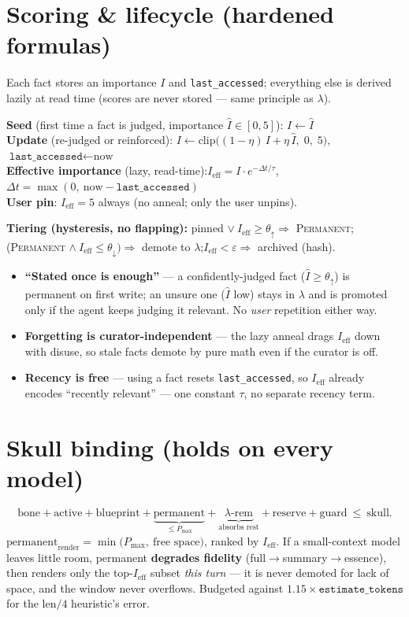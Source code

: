 \documentclass[11pt]{article}
\begin{document}
\section{Scoring \& lifecycle (hardened formulas)}
Each fact stores an importance $I$ and \texttt{last\_accessed}; everything else is derived lazily at read time (scores are never stored — same principle as $\lambda$).
\begin{keybox}
\textbf{Seed} (first time a fact is judged, importance $\hat I\in[0,5]$): \quad $I \gets \hat I$\\[2pt]
\textbf{Update} (re-judged or reinforced): \quad $I \gets \mathrm{clip}\big((1-\eta)\,I + \eta\,\hat I,\;0,\;5\big)$,\quad $\texttt{last\_accessed}\gets\text{now}$\\[2pt]
\textbf{Effective importance} (lazy, read-time):\quad $I_{\text{eff}} = I\cdot e^{-\Delta t/\tau}$,\quad $\Delta t=\max(0,\ \text{now}-\texttt{last\_accessed})$\\[2pt]
\textbf{User pin}: $I_{\text{eff}}=5$ always (no anneal; only the user unpins).
\end{keybox}
\textbf{Tiering (hysteresis, no flapping):} pinned $\lor\ I_{\text{eff}}\ge\theta_\uparrow \Rightarrow$ \textsc{Permanent};\quad (\textsc{Permanent} $\land\ I_{\text{eff}}\le\theta_\downarrow) \Rightarrow$ demote to $\lambda$;\quad $I_{\text{eff}}<\varepsilon \Rightarrow$ archived (hash).
\begin{itemize}[itemsep=0pt]
\item \textbf{``Stated once is enough''} — a confidently-judged fact ($\hat I\ge\theta_\uparrow$) is permanent on first write; an unsure one ($\hat I$ low) stays in $\lambda$ and is promoted only if the agent keeps judging it relevant. No \emph{user} repetition either way.
\item \textbf{Forgetting is curator-independent} — the lazy anneal drags $I_{\text{eff}}$ down with disuse, so stale facts demote by pure math even if the curator is off.
\item \textbf{Recency is free} — using a fact resets \texttt{last\_accessed}, so $I_{\text{eff}}$ already encodes ``recently relevant'' — one constant $\tau$, no separate recency term.
\end{itemize}

\section{Skull binding (holds on every model)}
\[ \text{bone}+\text{active}+\text{blueprint}+\underbrace{\text{permanent}}_{\le P_{\max}}+\underbrace{\lambda\text{-rem}}_{\text{absorbs rest}}+\text{reserve}+\text{guard}\ \le\ \text{skull}. \]
$\text{permanent}_{\text{render}}=\min\!\big(P_{\max},\ \text{free space}\big)$, ranked by $I_{\text{eff}}$. If a small-context model leaves little room, permanent \textbf{degrades fidelity} (full$\to$summary$\to$essence), then renders only the top-$I_{\text{eff}}$ subset \emph{this turn} — it is never demoted for lack of space, and the window never overflows. Budgeted against $1.15\times\texttt{estimate\_tokens}$ for the $\text{len}/4$ heuristic's error.
\end{document}
